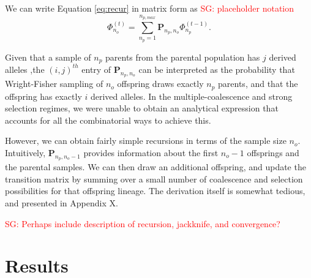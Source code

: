\documentclass[review]{elsarticle}
\newcommand{\afs}[2]{\Phi_{#1}^{(#2)}}
\newcommand{\sgcomment}[1]{\textcolor{red}{SG: #1}}
\begin{document}
We can write Equation \eqref{eq:recur} in matrix form as \sgcomment{placeholder notation}
 \begin{equation}
\label{eq:recur}
 \afs{n_o}{t} = \sum_{n_p=1}^{n_{p,max}} \mathbf{P}_{n_p,n_o} \afs{n_p}{t-1}.
\end{equation}

Given that a sample of $n_p$ parents from the parental population has $j$ derived alleles ,the $(i, j)^{th}$ entry of $\mathbf{P}_{n_p,n_o} $ can be interpreted as the probability that Wright-Fisher sampling of $n_o$ offspring draws exactly $n_p$ parents, and that the offspring has exactly $i$ derived alleles. 
In the multiple-coalescence and strong selection regimes, we were unable to obtain an analytical expression
 that accounts for all the combinatorial ways to achieve this. 
 
 However, we can obtain fairly simple recursions in terms of the sample size $n_o.$ 
 Intuitively,  $\mathbf{P}_{n_p,n_o-1}$ provides information about the first $n_o-1$ 
 offsprings and the parental samples. 
 We can then draw an additional offspring, and update the transition matrix by summing over a 
 small number of coalescence and selection possibilities for that offspring lineage.  
 The derivation itself is somewhat tedious, and presented in Appendix X. 

 
  \sgcomment{Perhaps include description of recursion, jackknife, and convergence?}
 \section{Results}
\label{sec:results}
 
 
\end{document}

